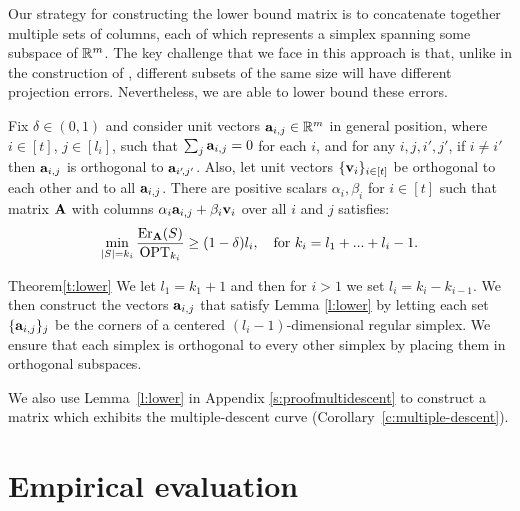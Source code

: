 \documentclass{article}
\begin{document}
Our strategy for constructing the lower bound matrix is to concatenate
together multiple sets of columns, each of which
represents a simplex spanning some subspace of $\mathbb R^m$. The key
challenge that we face in this approach is that, unlike in
the construction of \citet{pca-volume-sampling}, different subsets of
the same size will have different projection errors. Nevertheless,
we are able to lower bound these errors.
\begin{lemma}\label{l:lower}
Fix $\delta\in(0,1)$ and consider unit vectors
$\mathbf a_{i,j}\in\mathbb R^m$ in general position, where $i\in[t]$, $j\in[l_i]$, such that
$\sum_j\mathbf a_{i,j}=0$ for each $i$, and for any $i,j,i',j'$, if $i\ne i'$
then $\mathbf a_{i,j}$ is orthogonal to $\mathbf a_{i'\!,j'}$. Also, let unit vectors
$\{\mathbf v_i\}_{i\in[t]}$ be orthogonal to  each other and to all
$\mathbf a_{i,j}$. There are positive scalars $\alpha_{i},\beta_i$ for $ i \in [t]$
such that matrix $\mathbf A$ with columns 
$\alpha_{i}\mathbf a_{i,j}+\beta_i\mathbf v_i$ over all $i$ and $j$ satisfies:
\ifisarxiv\else\vspace{-1mm}\fi
\begin{align*}
  \min_{|S|=k_i}\frac{\mathrm{Er}_\mathbf A(S)}{\mathrm{OPT}_{k_i}}\geq
  (1-\delta)l_i,\quad\text{for }k_i=l_1+...+l_i-1.
\end{align*}
\end{lemma}
\ifisarxiv\else \vspace{-5mm}\fi
\begin{proofof}{Theorem}{\ref{t:lower}}
We let $l_1 = k_1+1$ and then for $i>1$ we set $l_i=k_i-k_{i-1}$. We
then construct the vectors $\mathbf a_{i,j}$ that satisfy Lemma \ref{l:lower} 
by letting each set $\{\mathbf a_{i,j}\}_{j}$ be the corners of a centered
$(l_i-1)$-dimensional regular simplex. We ensure that each
simplex is orthogonal to every other simplex by placing them in
orthogonal subspaces. 
\end{proofof}

We also use Lemma~\ref{l:lower} in Appendix \ref{s:proofmultidescent}
to construct a matrix which exhibits the multiple-descent curve
(Corollary~\ref{c:multiple-descent}). 

\section{Empirical evaluation}
\label{s:experiments}
\end{document}
